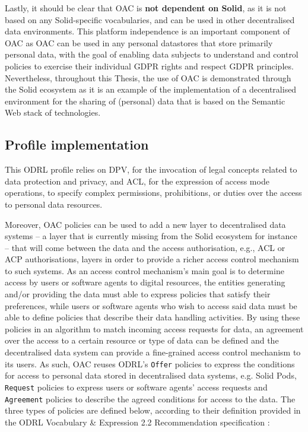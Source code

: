 Lastly, it should be clear that OAC is \textbf{not dependent on Solid}, as it is not based on any Solid-specific vocabularies, and can be used in other decentralised data environments.
This platform independence is an important component of OAC as OAC can be used in any personal datastores that store primarily personal data, with the goal of enabling data subjects to understand and control policies to exercise their individual GDPR rights and respect GDPR principles.
Nevertheless, throughout this Thesis, the use of OAC is demonstrated through the Solid ecosystem as it is an example of the implementation of a decentralised environment for the sharing of (personal) data that is based on the Semantic Web stack of technologies.

\subsection{Profile implementation}
\label{sec:oac_implementation}

This ODRL profile relies on DPV, for the invocation of legal concepts related to data protection and privacy, and ACL, for the expression of access mode operations, to specify complex permissions, prohibitions, or duties over the access to personal data resources.

Moreover, OAC policies can be used to add a new layer to decentralised data systems -- a layer that is currently missing from the Solid ecosystem for instance -- that will come between the data and the access authorisation, e.g., ACL or ACP authorisations, layers in order to provide a richer access control mechanism to such systems.
As an access control mechanism's main goal is to determine access by users or software agents to digital resources, the entities generating and/or providing the data must able to express policies that satisfy their preferences, while users or software agents who wish to access said data must be able to define policies that describe their data handling activities. 
By using these policies in an algorithm to match incoming access requests for data, an agreement over the access to a certain resource or type of data can be defined and the decentralised data system can provide a fine-grained access control mechanism to its users.
As such, OAC reuses ODRL's \texttt{Offer} policies to express the conditions for access to personal data stored in decentralised data systems, e.g. Solid Pods, \texttt{Request} policies to express users or software agents' access requests and \texttt{Agreement} policies to describe the agreed conditions for access to the data. 
The three types of policies are defined below, according to their definition provided in the ODRL Vocabulary \& Expression 2.2 Recommendation specification \citep{iannella_odrl_vocab_2018}:

